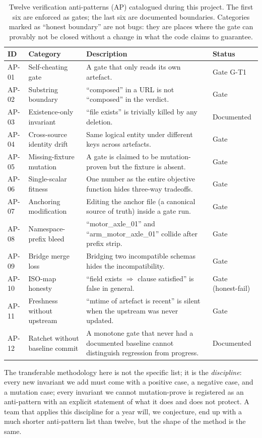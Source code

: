 \documentclass[11pt,twocolumn]{article}
\begin{document}
\begin{table}[h]
\centering
\caption{Twelve verification anti-patterns (AP) catalogued during this
project. The first six are enforced as gates; the last six are
documented boundaries. Categories marked as ``honest boundary'' are
not bugs: they are places where the gate can provably not be closed
without a change in what the code claims to guarantee.}
\label{tab:ap}
\begin{tabular}{llp{5.5cm}l}
\hline
ID & Category & Description & Status \\
\hline
AP-01 & Self-cheating gate & A gate that only reads its own artefact. & Gate G-T1 \\
AP-02 & Substring boundary & ``composed'' in a URL is not ``composed'' in the verdict. & Gate \\
AP-03 & Existence-only invariant & ``file exists'' is trivially killed by any deletion. & Documented \\
AP-04 & Cross-source identity drift & Same logical entity under different keys across artefacts. & Gate \\
AP-05 & Missing-fixture mutation & A gate is claimed to be mutation-proven but the fixture is absent. & Gate \\
AP-06 & Single-scalar fitness & One number as the entire objective function hides three-way tradeoffs. & Gate \\
AP-07 & Anchoring modification & Editing the anchor file (a canonical source of truth) inside a gate run. & Gate \\
AP-08 & Namespace-prefix bleed & ``motor\_axle\_01'' and ``arm\_motor\_axle\_01'' collide after prefix strip. & Gate \\
AP-09 & Bridge merge loss & Bridging two incompatible schemas hides the incompatibility. & Gate \\
AP-10 & ISO-map honesty & ``field exists $\Rightarrow$ clause satisfied'' is false in general. & Gate (honest-fail) \\
AP-11 & Freshness without upstream & ``mtime of artefact is recent'' is silent when the upstream was never updated. & Gate \\
AP-12 & Ratchet without baseline commit & A monotone gate that never had a documented baseline cannot distinguish regression from progress. & Documented \\
\hline
\end{tabular}
\end{table}

The transferable methodology here is not the specific list; it is the
\emph{discipline}: every new invariant we add must come with a
positive case, a negative case, and a mutation case; every invariant
we cannot mutation-prove is registered as an anti-pattern with an
explicit statement of what it does and does not protect. A team that
applies this discipline for a year will, we conjecture, end up with a
much shorter anti-pattern list than twelve, but the shape of the
method is the same.
\end{document}
